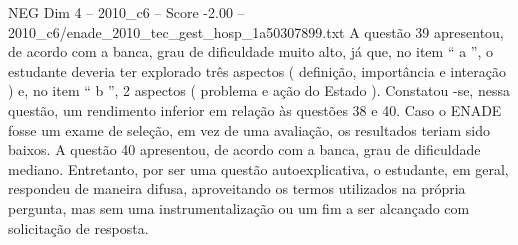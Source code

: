 \begin{textsample}{NEG Dim 4 – 2010\_c6 – Score -2.00 – 2010\_c6/enade\_2010\_tec\_gest\_hosp\_1a50307899.txt}
A questão 39 apresentou, de acordo com a banca, grau de dificuldade muito alto, já que, no item “ a ”, o estudante deveria ter explorado três aspectos ( definição, importância e interação ) e, no item “ b ”, 2 aspectos ( problema e ação do Estado ).
Constatou -se, nessa questão, um rendimento inferior em relação às questões 38 e 40.
Caso o ENADE fosse um exame de seleção, em vez de uma avaliação, os resultados teriam sido baixos.
A questão 40 apresentou, de acordo com a banca, grau de dificuldade mediano.
Entretanto, por ser uma questão autoexplicativa, o estudante, em geral, respondeu de maneira difusa, aproveitando os termos utilizados na própria pergunta, mas sem uma instrumentalização ou um fim a ser alcançado com solicitação de resposta.

\end{textsample}
